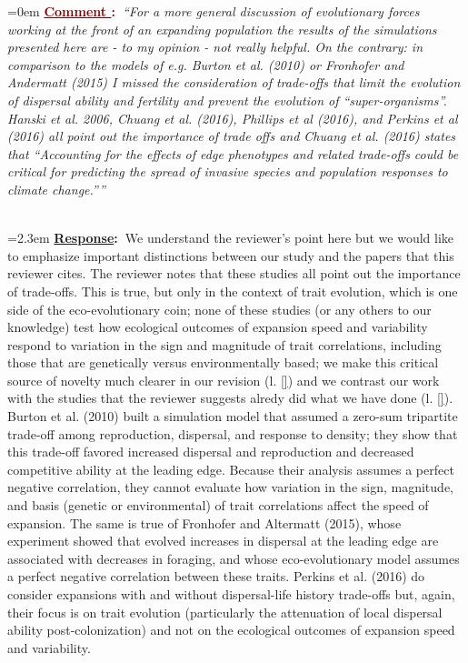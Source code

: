 \documentclass[12pt]{article}
\newcounter{cN}
\newcommand{\comment}[1]{
	\vspace{2em}
	\refstepcounter{cN} %
	\noindent \hangindent=0em \textbf{\textcolor{Maroon}{\uline{Comment \thecN}:~}}\emph{``#1''}
	}
\newcommand{\response}[1]{
	\\[0.25em]
	\hangindent=2.3em \textbf{\textcolor{NavyBlue}{\uline{Response}:~}}#1
	}
\begin{document}
\comment{For a more general discussion of evolutionary forces working at the front of an expanding population the results of the simulations presented here are - to my opinion - not really helpful.
On the contrary: in comparison to the models of e.g. Burton et al. (2010) or Fronhofer and Andermatt (2015) I missed the consideration of trade-offs that limit the evolution of dispersal ability and fertility and prevent the evolution of ``super-organisms''. Hanski et al. 2006, Chuang et al. (2016), Phillips et al (2016), and Perkins et al (2016) all point out the importance of trade offs and Chuang et al. (2016) states that ``Accounting for the effects of edge phenotypes and related trade-offs could be critical for predicting the spread of invasive species and population responses to climate change.''}
\response{We understand the reviewer's point here but we would like to emphasize important distinctions between our study and the papers that this reviewer cites.
The reviewer notes that these studies all point out the importance of trade-offs.
This is true, but only in the context of trait evolution, which is one side of the eco-evolutionary coin; none of these studies (or any others to our knowledge) test how ecological outcomes of expansion speed and variability respond to variation in the sign and magnitude of trait correlations, including those that are genetically versus environmentally based; we make this critical source of novelty much clearer in our revision (l. \ref{}) and we contrast our work with the studies that the reviewer suggests alredy did what we have done (l. \ref{}).
Burton et al. (2010) built a simulation model that assumed a zero-sum tripartite trade-off among reproduction, dispersal, and response to density; they show that this trade-off favored increased dispersal and reproduction and decreased competitive ability at the leading edge.
Because their analysis assumes a perfect negative correlation, they cannot evaluate how variation in the sign, magnitude, and basis (genetic or environmental) of trait correlations affect the speed of expansion.
The same is true of Fronhofer and Altermatt (2015), whose experiment showed that evolved increases in dispersal at the leading edge are associated with decreases in foraging, and whose eco-evolutionary model assumes a perfect negative correlation between these traits.
Perkins et al. (2016) do consider expansions with and without dispersal-life history trade-offs but, again, their focus is on trait evolution (particularly the attenuation of local dispersal ability post-colonization) and not on the ecological outcomes of expansion speed and variability.
}
\end{document}
